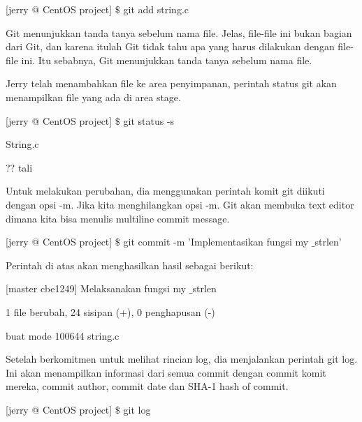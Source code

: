 \noindent 
 \hspace*{0.5in} [jerry @ CentOS project]  $  \$  $ git add string.c \par
\noindent 
Git menunjukkan tanda tanya sebelum nama file. Jelas, file-file ini bukan bagian dari Git, dan karena itulah Git tidak tahu apa yang harus dilakukan dengan file-file ini. Itu sebabnya, Git menunjukkan tanda tanya sebelum nama file. \par
\noindent 
Jerry telah menambahkan file ke area penyimpanan, perintah status git akan menampilkan file yang ada di area stage. \par
\noindent 
 \hspace*{0.5in} [jerry @ CentOS project]  $  \$  $ git status -s \par
\noindent 
 \hspace*{0.5in} String.c \par
\noindent 
 \hspace*{0.5in} ?? tali \par
\noindent 
 \hspace*{0.5in} Untuk melakukan perubahan, dia menggunakan perintah komit git diikuti dengan opsi -m. Jika kita menghilangkan opsi -m. Git akan membuka text editor dimana kita bisa menulis multiline commit message. \par
\noindent 
 \hspace*{0.5in} [jerry @ CentOS project]  $  \$  $ git commit -m 'Implementasikan fungsi my $  \_  $strlen' \par
\noindent 
 \hspace*{0.5in} Perintah di atas akan menghasilkan hasil sebagai berikut: \par
\noindent 
 \hspace*{0.5in} [master cbe1249] Melaksanakan fungsi my $  \_  $strlen \par
\noindent 
 \hspace*{0.5in} 1 file berubah, 24 sisipan (+), 0 penghapusan (-) \par
\noindent 
 \hspace*{0.5in} buat mode 100644 string.c \par
\noindent 
Setelah berkomitmen untuk melihat rincian log, dia menjalankan perintah git log. Ini akan menampilkan informasi dari semua commit dengan commit komit mereka, commit author, commit date dan SHA-1 hash of commit. \par
\noindent 
 \hspace*{0.5in} [jerry @ CentOS project]  $  \$  $ git log \par
